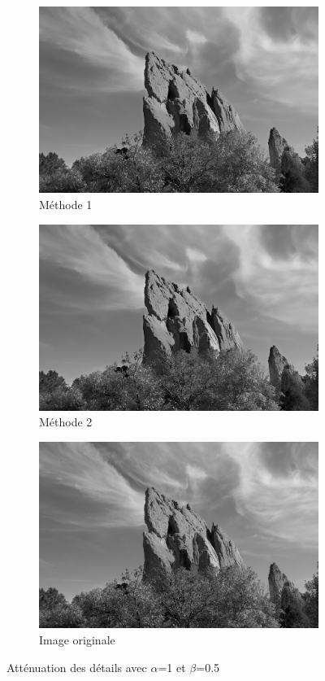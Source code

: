 \documentclass[twoside,UTF8]{EPURapport}
\begin{document}
\begin{figure}
        \centering
        \begin{subfigure}[b]{0.3\textwidth}
                \includegraphics[scale=0.4]{images/rock_input1_1_05.png} 
                \caption{Méthode 1}
        \end{subfigure}
        \qquad \qquad
        \begin{subfigure}[b]{0.3\textwidth}
                \includegraphics[scale=0.4]{images/rock_input2_1_05.png}
                \caption{Méthode 2}
        \end{subfigure}
        
        \begin{subfigure}[b]{0.3\textwidth}
                \includegraphics[scale=0.4]{images/rock_input.png}
             	\caption{Image originale}
        \end{subfigure}
        \caption{Atténuation des détails avec $\alpha$=1 et $\beta$=0.5}
\end{figure}
\end{document}
